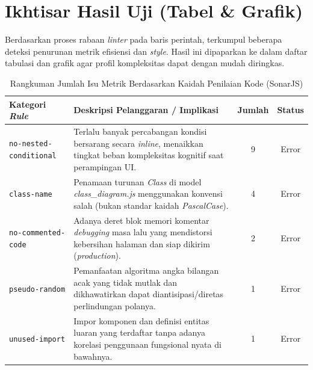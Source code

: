 \documentclass[12pt, a4paper]{article}
\begin{document}
\section{Ikhtisar Hasil Uji (Tabel \& Grafik)}
Berdasarkan proses rabaan \textit{linter} pada baris perintah, terkumpul beberapa deteksi penurunan metrik efisiensi dan \textit{style}. Hasil ini dipaparkan ke dalam daftar tabulasi dan grafik agar profil kompleksitas dapat dengan mudah diringkas.

\begin{table}[H]
    \centering
    \begin{tabularx}{\textwidth}{|l|X|c|c|}
        \hline
        \textbf{Kategori \textit{Rule}} & \textbf{Deskripsi Pelanggaran / Implikasi} & \textbf{Jumlah} & \textbf{Status} \\ \hline
        \texttt{no-nested-conditional} & Terlalu banyak percabangan kondisi bersarang secara \textit{inline}, menaikkan tingkat beban kompleksitas kognitif saat perampingan UI. & 9 & Error \\ \hline
        \texttt{class-name} & Penamaan turunan \textit{Class} di model \textit{class\_diagram.js} menggunakan konvensi salah (bukan standar kaidah \textit{PascalCase}). & 4 & Error \\ \hline
        \texttt{no-commented-code} & Adanya deret blok memori komentar \textit{debugging} masa lalu yang mendistorsi kebersihan halaman dan siap dikirim (\textit{production}). & 2 & Error \\ \hline
        \texttt{pseudo-random} & Pemanfaatan algoritma angka bilangan acak yang tidak mutlak dan dikhawatirkan dapat diantisipasi/diretas perlindungan polanya. & 1 & Error \\ \hline
        \texttt{unused-import} & Impor komponen dan definisi entitas luaran yang terdaftar tanpa adanya korelasi penggunaan fungsional nyata di bawahnya. & 1 & Error \\ \hline
    \end{tabularx}
    \caption{Rangkuman Jumlah Isu Metrik Berdasarkan Kaidah Penilaian Kode (SonarJS)}
\end{table}
\end{document}
